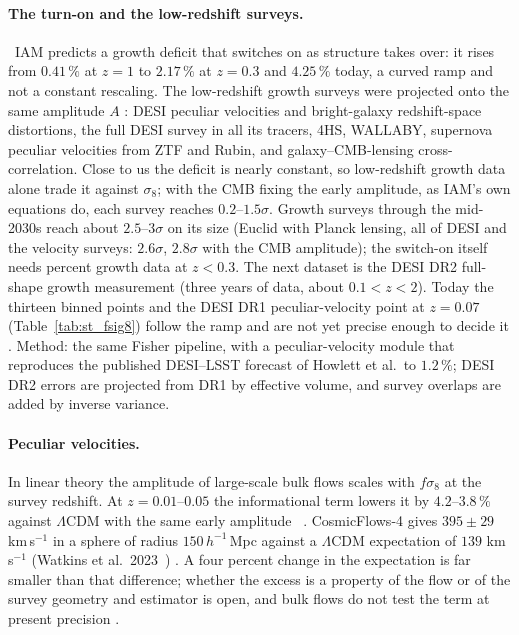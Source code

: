 \paragraph{The turn-on and the low-redshift surveys.} \prediction\ IAM predicts a growth deficit that switches on as structure takes over: it
rises from $0.41\,\%$ at $z=1$ to $2.17\,\%$ at $z=0.3$ and $4.25\,\%$ today, a curved ramp and not a constant rescaling. The low-redshift growth
surveys were projected onto the same amplitude $A$ \calc: DESI peculiar velocities and bright-galaxy redshift-space distortions, the full DESI
survey in all its tracers, 4HS, WALLABY, supernova peculiar velocities from ZTF and Rubin, and galaxy--CMB-lensing cross-correlation. Close to us the
deficit is nearly constant, so low-redshift growth data alone trade it against $\sigma_8$; with the CMB fixing the early amplitude, as IAM's own
equations do, each survey reaches $0.2$--$1.5\sigma$. Growth surveys through the mid-2030s reach about $2.5$--$3\sigma$ on its size (Euclid with
Planck lensing, all of DESI and the velocity surveys: $2.6\sigma$, $2.8\sigma$ with the CMB amplitude); the switch-on itself needs percent growth
data at $z<0.3$. The next dataset is the DESI DR2 full-shape growth measurement (three years of data, about $0.1<z<2$). Today the thirteen binned
points and the DESI DR1 peculiar-velocity point at $z=0.07$ (Table~\ref{tab:st_fsig8}) follow the ramp and are not yet precise enough to decide it
\observed. Method: the same Fisher pipeline, with a peculiar-velocity module that reproduces the published DESI--LSST forecast of Howlett et al.\ to
$1.2\,\%$; DESI DR2 errors are projected from DR1 by effective volume, and survey overlaps are added by inverse variance.

\paragraph{Peculiar velocities.} In linear theory the amplitude of large-scale bulk flows scales with $f\sigma_8$ at the survey redshift. At $z=0.01$--$0.05$ the informational term lowers it by $4.2$--$3.8\,\%$ against $\Lambda$CDM with the same early amplitude \calc\ \prediction. CosmicFlows-4 gives $395\pm29$ km\,s$^{-1}$ in a sphere of radius $150\,h^{-1}$\,Mpc against a $\Lambda$CDM expectation of $139$ km\,s$^{-1}$ (Watkins et al.\ 2023~\cite{Watkins2023}) \observed. A four percent change in the expectation is far smaller than that difference; whether the excess is a property of the flow or of the survey geometry and estimator is open, and bulk flows do not test the term at present precision \openprob.

